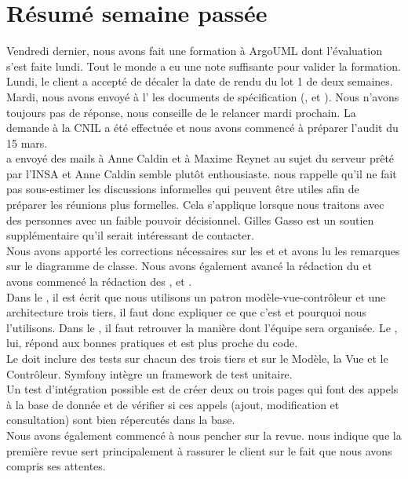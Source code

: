 \documentclass [a4paper] {article}
\begin{document}
\section{Résumé semaine passée}
Vendredi dernier, nous avons fait une formation à ArgoUML dont l'évaluation s'est faite lundi. Tout le monde a eu une note suffisante pour valider la formation. Lundi, le client a accepté de décaler la date de rendu du lot 1 de deux semaines. Mardi, nous avons envoyé à l'\nomClient{} les documents de spécification (\DSE{}, \DSI{} et \PTV{}). Nous n'avons toujours pas de réponse, \nomTuteurPedago{} nous conseille de le relancer mardi prochain. La demande à la CNIL a été effectuée et nous avons commencé à préparer l'audit du 15 mars.\\
\Sergi{} a envoyé des mails à Anne Caldin et à Maxime Reynet au sujet du serveur prêté par l'INSA et Anne Caldin semble plutôt enthousiaste. \nomTuteurPedago{} nous rappelle qu'il ne fait pas sous-estimer les discussions informelles qui peuvent être utiles afin de préparer les réunions plus formelles. Cela s'applique lorsque nous traitons avec des personnes avec un faible pouvoir décisionnel. Gilles Gasso est un soutien supplémentaire qu'il serait intéressant de contacter.\\
Nous avons apporté les corrections nécessaires sur les \DSI{} et \PTV{} et avons lu les remarques sur le diagramme de classe. Nous avons également avancé la rédaction du \DCP{} et avons commencé la rédaction des \DCD{}, \PTI{} et \PTU{}. \\
Dans le \DSI{}, il est écrit que nous utilisons un patron modèle-vue-contrôleur et une architecture trois tiers, il faut donc expliquer ce que c'est et pourquoi nous l'utilisons. Dans le \DCP{}, il faut retrouver la manière dont l'équipe sera organisée. Le \DCD{}, lui, répond aux bonnes pratiques et est plus proche du code. \\
Le \PTV{} doit inclure des tests sur chacun des trois tiers et sur le Modèle, la Vue et le Contrôleur. Symfony intègre un framework de test unitaire. \\
Un test d'intégration possible est de créer deux ou trois pages qui font des appels à la base de donnée et de vérifier si ces appels (ajout, modification et consultation) sont bien répercutés dans la base. \\
Nous avons également commencé à nous pencher sur la revue. \nomTuteurPedago{} nous indique que la première revue sert principalement à rassurer le client sur le fait que nous avons compris ses attentes.
\end{document}

